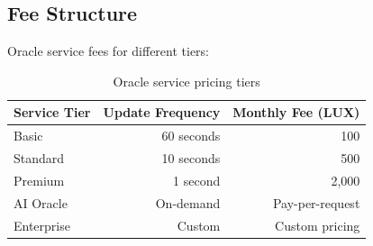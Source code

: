 \subsection{Fee Structure}

Oracle service fees for different tiers:

\begin{table}[h]
\centering
\begin{tabular}{lrr}
\toprule
\textbf{Service Tier} & \textbf{Update Frequency} & \textbf{Monthly Fee (LUX)} \\
\midrule
Basic & 60 seconds & 100 \\
Standard & 10 seconds & 500 \\
Premium & 1 second & 2,000 \\
AI Oracle & On-demand & Pay-per-request \\
Enterprise & Custom & Custom pricing \\
\bottomrule
\end{tabular}
\caption{Oracle service pricing tiers}
\end{table}

